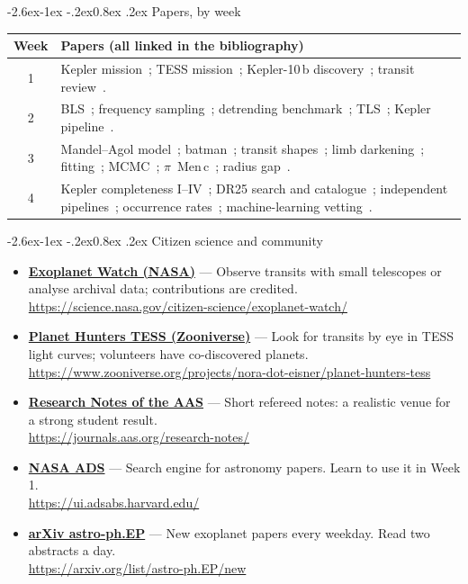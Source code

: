 \documentclass[11pt,a4paper]{article}
\makeatletter
\renewcommand\subsection{\@startsection{subsection}{2}{\z@}%
  {-2.6ex\@plus -1ex \@minus -.2ex}{0.8ex \@plus .2ex}%
  {\normalfont\sffamily\Large\bfseries\color{navy}}}
\newcommand{\res}[3]{\item \textbf{\href{#2}{#1}} --- #3\\[-1pt]{\scriptsize\color{gray}\url{#2}}}
\newenvironment{reslist}{\begin{itemize}\setlength{\itemsep}{5pt}}{\end{itemize}}
\makeatother
\begin{document}
\subsection{Papers, by week}
\begin{center}
\small
\begin{tabularx}{\linewidth}{@{}c Y@{}}
\toprule
\textbf{Week} & \textbf{Papers (all linked in the bibliography)}\\
 & Kepler mission~\citep{Borucki2010}; TESS mission~\citep{Ricker2015}; Kepler-10\,b discovery~\citep{Batalha2011}; transit review~\citep{Winn2010}.\\
2 & BLS~\citep{Kovacs2002}; frequency sampling~\citep{Ofir2014}; detrending benchmark~\citep{Hippke2019wotan}; TLS~\citep{HippkeHeller2019}; Kepler pipeline~\citep{Jenkins2010}.\\
3 & Mandel--Agol model~\citep{MandelAgol2002}; batman~\citep{Kreidberg2015}; transit shapes~\citep{SeagerMallenOrnelas2003}; limb darkening~\citep{Claret2011,Claret2017,Kipping2013,Heller2019}; fitting~\citep{Hogg2010}; MCMC~\citep{ForemanMackey2013,HoggForemanMackey2018}; \(\pi\)~Men\,c~\citep{Huang2018}; radius gap~\citep{Fulton2017}.\\
4 & Kepler completeness I--IV~\citep{Christiansen2013,Christiansen2015,Christiansen2016,Christiansen2020}; DR25 search and catalogue~\citep{Twicken2016,Thompson2018}; independent pipelines~\citep{Petigura2013,Dressing2015}; occurrence rates~\citep{Burke2015}; machine-learning vetting~\citep{ShallueVanderburg2018}.\\
\bottomrule
\end{tabularx}
\end{center}

\subsection{Citizen science and community}
\begin{reslist}
\res{Exoplanet Watch (NASA)}{https://science.nasa.gov/citizen-science/exoplanet-watch/}{Observe transits with small telescopes or analyse archival data; contributions are credited.}
\res{Planet Hunters TESS (Zooniverse)}{https://www.zooniverse.org/projects/nora-dot-eisner/planet-hunters-tess}{Look for transits by eye in TESS light curves; volunteers have co-discovered planets.}
\res{Research Notes of the AAS}{https://journals.aas.org/research-notes/}{Short refereed notes: a realistic venue for a strong student result.}
\res{NASA ADS}{https://ui.adsabs.harvard.edu/}{Search engine for astronomy papers. Learn to use it in Week 1.}
\res{arXiv astro-ph.EP}{https://arxiv.org/list/astro-ph.EP/new}{New exoplanet papers every weekday. Read two abstracts a day.}
\end{reslist}
\end{document}
